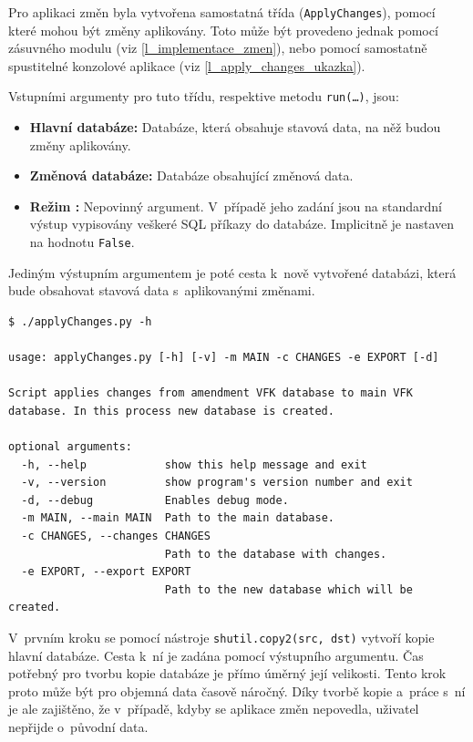 \documentclass[a4paper,12pt,oneside]{book}
\begin{document}
Pro aplikaci změn byla vytvořena samostatná třída (\texttt{ApplyChanges}), pomocí které mohou být změny aplikovány. Toto může být provedeno jednak pomocí zásuvného modulu (viz \ref{l_implementace_zmen}), nebo pomocí samostatně spustitelné konzolové aplikace (viz \ref{l_apply_changes_ukazka}).

Vstupními argumenty pro tuto třídu, respektive metodu \texttt{run(\dots)}, jsou:

\begin{itemize}
 \item \textbf{Hlavní databáze:} Databáze, která obsahuje stavová data, na něž budou změny aplikovány.
 \item \textbf{Změnová databáze:} Databáze obsahující změnová data.
 \item \textbf{Režim :} Nepovinný argument. V~případě jeho zadání jsou na standardní výstup vypisovány veškeré SQL příkazy do databáze. Implicitně je nastaven na hodnotu \texttt{False}.
\end{itemize}

Jediným výstupním argumentem je poté cesta k~nově vytvořené databázi, která bude obsahovat stavová data s~aplikovanými změnami.

\begin{lstlisting}[caption={Nápověda ke konzolové aplikaci pro implementaci změn}, 
		    label=l_apply_changes_ukazka]
$ ./applyChanges.py -h

usage: applyChanges.py [-h] [-v] -m MAIN -c CHANGES -e EXPORT [-d]

Script applies changes from amendment VFK database to main VFK database. In this process new database is created.

optional arguments:
  -h, --help            show this help message and exit
  -v, --version         show program's version number and exit
  -d, --debug           Enables debug mode.
  -m MAIN, --main MAIN  Path to the main database.
  -c CHANGES, --changes CHANGES
                        Path to the database with changes.
  -e EXPORT, --export EXPORT
                        Path to the new database which will be created.
\end{lstlisting}

V~prvním kroku se pomocí nástroje \texttt{shutil.copy2(src, dst)} vytvoří kopie hlavní databáze. Cesta k~ní je zadána pomocí výstupního argumentu. Čas potřebný pro tvorbu kopie databáze je přímo úměrný její velikosti. Tento krok proto může být pro objemná data časově náročný. Díky tvorbě kopie a~práce s~ní je ale zajištěno, že v~případě, kdyby se aplikace změn nepovedla, uživatel nepřijde o~původní data.
\end{document}
